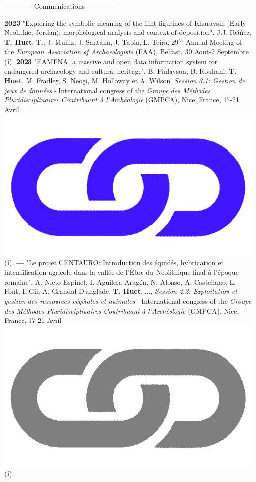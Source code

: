 \documentclass{article}
\begin{document}
\begin{center}------------ Communications ------------\end{center}
\smallbreak
\textbf{2023 }"Exploring the symbolic meaning of the flint figurines of Kharaysin (Early Neolithic, Jordan): morphological analysis and context of deposition". J.J. Ibáñez, \textbf{T. Huet}, T., J. Muñiz, J. Santana, J. Tapia, L. Teira, 29${}^{th}$ Annual Meeting of the \textit{European Association of Archaeologists} (EAA), Belfast, 30 Aout-2 Septembre (\textbf{i}).
\smallbreak
\textbf{2023 }"EAMENA, a massive and open data information system for endangered archaeology and cultural heritage". B. Finlayson, B. Rouhani, \textbf{T. Huet}, M. Fradley, S. Neogi, M. Holloway et A. Wilson, \textit{Session 3.1: Gestion de jeux de données} - International congress of the \textit{Groupe des Méthodes Pluridisciplinaires Contribuant à l'Archéologie} (GMPCA), Nice, France, 17-21 Avril \href{https://eamena-project.github.io/eamena-arches-dev/talks/2023-gmpca/pres/#/title-slide}{\includegraphics[scale=0.02]{link_darkblue.png}} (\textbf{i}).
\smallbreak
\textbf{--- }"Le projet CENTAURO: Introduction des équidés, hybridation et intensification agricole dans la vallée de l'Èbre du Néolithique final à l'époque romaine". A. Nieto-Espinet, I. Aguilera Aragón, N. Alonso, A. Castellano, L. Font, I. Gil, A. Grandal D'anglade, \textbf{T. Huet}, ..., \textit{Session 2.2: Exploitation et gestion des ressources végétales et animales} - International congress of the \textit{Groupe des Méthodes Pluridisciplinaires Contribuant à l'Archéologie} (GMPCA), Nice, France, 17-21 Avril \href{https://gmpca2023.sciencesconf.org/}{\includegraphics[scale=0.02]{link_grey.png}} (\textbf{i}).
\end{document}
